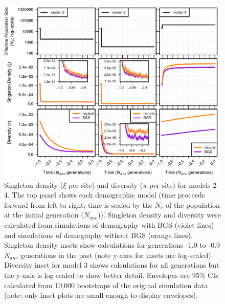 \documentclass[9pt,twocolumn,twoside]{rilabRxiv}
\begin{document}
\begin{figure}[h!]
\includegraphics[width=.9\linewidth]{figures/FigS6.pdf}
\caption{Singleton density ($\xi$ per site) and diversity ($\pi$ per site) for models 2-4.
The top panel shows each demographic model (time proceeds forward from left to right; time is scaled by the $N_e$ of the population at the initial generation ($N_{anc}$)).
Singleton density and diversity were calculated from simulations of demography with BGS (violet lines) and simulations of demography without BGS (orange lines).
Singleton density insets show calculations for generations -1.0 to -0.9 $N_{anc}$ generations in the past (note y-axes for insets are log-scaled).
Diversity inset for model 3 shows calculations for all generations but the y-axis is log-scaled to show better detail.
Envelopes are 95\% CIs calculated from 10,000 bootstraps of the original simulation data (note: only inset plots are small enough to display envelopes).}
\label{fig:S6}
\end{figure}
\pagebreak



\end{document}
